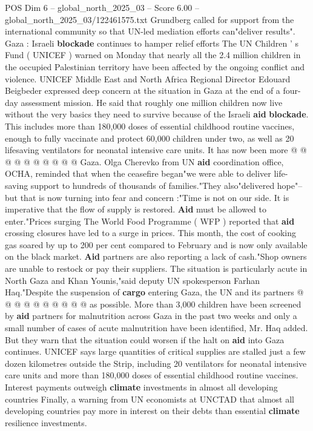 \begin{textsample}{POS Dim 6 – global\_north\_2025\_03 – Score 6.00 – global\_north\_2025\_03/122461575.txt}
Grundberg called for support from the international community so that UN-led mediation efforts can"deliver results".
Gaza : Israeli \textbf{blockade} continues to hamper relief efforts The UN Children ' s Fund ( UNICEF ) warned on Monday that nearly all the 2.4 million children in the occupied Palestinian territory have been affected by the ongoing conflict and violence.
UNICEF Middle East and North Africa Regional Director Edouard Beigbeder expressed deep concern at the situation in Gaza at the end of a four-day assessment mission.
He said that roughly one million children now live without the very basics they need to survive because of the Israeli \textbf{aid} \textbf{blockade}.
This includes more than 180,000 doses of essential childhood routine vaccines, enough to fully vaccinate and protect 60,000 children under two, as well as 20 lifesaving ventilators for neonatal intensive care units.
It has now been more @ @ @ @ @ @ @ @ @ @ Gaza.
Olga Cherevko from UN \textbf{aid} coordination office, OCHA, reminded that when the ceasefire began"we were able to deliver life-saving support to hundreds of thousands of families."They also"delivered hope"-- but that is now turning into fear and concern :"Time is not on our side.
It is imperative that the flow of supply is restored. \textbf{Aid} must be allowed to enter."Prices surging The World Food Programme ( WFP ) reported that \textbf{aid} crossing closures have led to a surge in prices.
This month, the cost of cooking gas soared by up to 200 per cent compared to February and is now only available on the black market. \textbf{Aid} partners are also reporting a lack of cash."Shop owners are unable to restock or pay their suppliers.
The situation is particularly acute in North Gaza and Khan Younis,"said deputy UN spokesperson Farhan Haq."Despite the suspension of \textbf{cargo} entering Gaza, the UN and its partners @ @ @ @ @ @ @ @ @ @ as possible.
More than 3,000 children have been screened by \textbf{aid} partners for malnutrition across Gaza in the past two weeks and only a small number of cases of acute malnutrition have been identified, Mr.
Haq added.
But they warn that the situation could worsen if the halt on \textbf{aid} into Gaza continues.
UNICEF says large quantities of critical supplies are stalled just a few dozen kilometres outside the Strip, including 20 ventilators for neonatal intensive care units and more than 180,000 doses of essential childhood routine vaccines.
Interest payments outweigh \textbf{climate} investments in almost all developing countries Finally, a warning from UN economists at UNCTAD that almost all developing countries pay more in interest on their debts than essential \textbf{climate} resilience investments.

\end{textsample}
